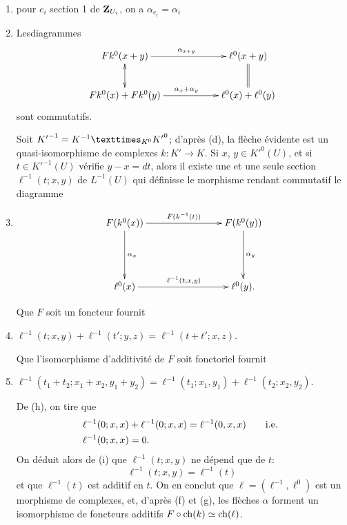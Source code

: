 \documentclass[10pt]{../fichiers-configuration-latex/smfart}
\begin{document}
\begin{enumerate}
\item pour $e_{i}$ section 1 de $\mathbf{Z}_{U_{i}}$, on a
$\alpha_{e_{i}}=\alpha_{i}$

\item Les\pageoriginale diagrammes
$$
\xymatrix@C=2cm{
Fk^0(x+y)  \ar[r]^{\alpha_{x+y}} \ar@{<->}[d]& \ell^0(x+y)
\ar@{=}[d]\\
Fk^0(x)+ Fk^0(y)    \ar[r]^{\alpha_{x} + \alpha_{y}}     & \ell^0(x)+\ell^0(y)
}
$$
sont commutatifs.

Soit ${K'}^{-1}=\fprod{K^{-1}}{{K'}^{0}}{K^{0}}$; d'après (d), la
flèche évidente est un quasi-isomorphisme de complexes
$k:K'\rightarrow K$. Si $x$, $y\in {K'}^{0}(U)$, et si $t\in
{K'}^{-1}(U)$ vérifie $y-x=dt$, alors il existe une et une
seule section $\ell^{-1}(t;x,y)$ de $L^{-1}(U)$ qui définisse le
morphisme rendant commutatif le diagramme

\item $\begin{array}[t]{c}
\xymatrix@C=2.75cm@R=1.75cm{
&F(k^0(x))  \ar[r]^{F(k^{-1}(t))} \ar[d]^{\alpha_x}&
  F(k^0(y))\ar[d]^{\alpha_y} \\ 
&\ell^0(x)     \ar[r]^{\ell^{-1}(t;x,y)}& \ell^0(y).
}
\end{array}$


Que $F$ soit un foncteur fournit

\item $\ell^{-1}(t;x,y)+\ell^{-1}(t';y,z)=\ell^{-1}(t+t';x,z)$.

Que l'isomorphisme d'additivité de $F$ soit fonctoriel fournit

\item $\ell^{-1}(t_{1}+t_{2};x_{1}+x_{2},
y_{1}+y_{2})=\ell^{-1}(t_{1};x_{1},y_{1})+\ell^{-1}(t_{2};x_{2},y_{2})$.

De (h), on tire que
\begin{align*}
&\ell^{-1}(0;x,x)+\ell^{-1}(0;x,x)=\ell^{-1}(0,x,x)\qquad \text{{i.e.}\kern.3em}\\
& \ell^{-1}(0;x,x)=0{}.
\end{align*}
On déduit alors de (i) que $\ell^{-1}(t;x,y)$ ne dépend que de $t$:
$$
\ell^{-1}(t;x,y)=\ell^{-1}(t)
$$
et que $\ell^{-1}(t)$ est additif en $t$. On en conclut que
$\ell=(\ell^{-1}, \ell^{0})$ est un morphisme de complexes, et,
d'après (f) et (g), les flèches $\alpha$ forment un isomorphisme de
foncteurs additifs $F\circ \operatorname{ch}(k)\simeq\operatorname{ch}(\ell)$.
\end{enumerate}

\setcounter{subsubsection}{13}
\end{document}
